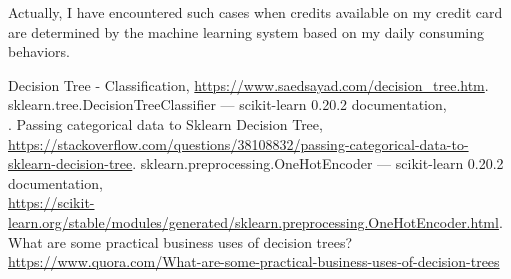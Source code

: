 \documentclass[12pt,letterpaper]{article}
\begin{document}
 Actually, I have encountered such cases when credits available on my credit card are determined by the machine learning system based on my daily consuming behaviors.

\newpage
\begin{thebibliography}{10}
     Decision Tree - Classification, \url{https://www.saedsayad.com/decision_tree.htm}.
     sklearn.tree.DecisionTreeClassifier — scikit-learn 0.20.2 documentation, \\ .
     Passing categorical data to Sklearn Decision Tree, \url{https://stackoverflow.com/questions/38108832/passing-categorical-data-to-sklearn-decision-tree}.
     sklearn.preprocessing.OneHotEncoder — scikit-learn 0.20.2 documentation, \\ \url{https://scikit-learn.org/stable/modules/generated/sklearn.preprocessing.OneHotEncoder.html}.
     What are some practical business uses of decision trees? \\ \url{https://www.quora.com/What-are-some-practical-business-uses-of-decision-trees}
    \end{thebibliography}
\end{document}
